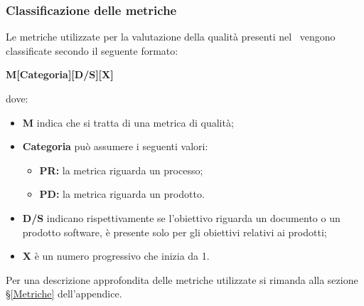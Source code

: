 \subsubsection{Classificazione delle metriche}\label{ClassificazioneMetriche}
Le metriche utilizzate per la valutazione della qualità presenti nel \ vengono classificate secondo il seguente formato:
\begin{center}
	\textbf{M[Categoria][D/S][X]}
\end{center}
dove: 
\begin{itemize}
	\item \textbf{M} indica che si tratta di una metrica di qualità;
	\item \textbf{Categoria} può assumere i seguenti valori:
	\begin{itemize}
		\item \textbf{PR:} la metrica riguarda un processo;
		\item \textbf{PD:} la metrica riguarda un prodotto.
	\end{itemize}
	\item \textbf{D/S} indicano rispettivamente se l'obiettivo riguarda un documento o un prodotto software, è presente solo per gli obiettivi relativi ai prodotti;
	\item \textbf{X} è un numero progressivo che inizia da 1.
\end{itemize}
Per una descrizione approfondita delle metriche utilizzate si rimanda alla sezione \S\ref{Metriche} dell'appendice.